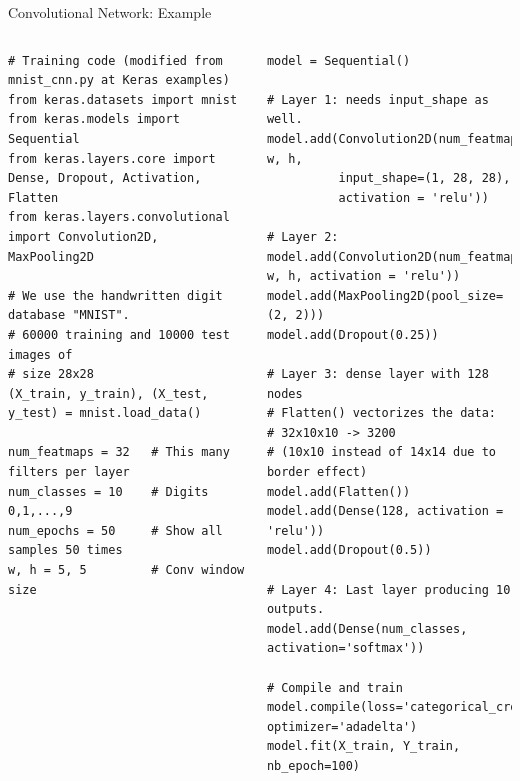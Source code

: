 \documentclass[10pt, aspectratio=169]{beamer} %
\begin{document}
\begin{frame}[fragile]{Convolutional Network: Example}
\begin{columns}
\begin{lstlisting}
# Training code (modified from mnist_cnn.py at Keras examples)
from keras.datasets import mnist
from keras.models import Sequential
from keras.layers.core import Dense, Dropout, Activation, Flatten
from keras.layers.convolutional import Convolution2D, MaxPooling2D

# We use the handwritten digit database "MNIST".
# 60000 training and 10000 test images of 
# size 28x28
(X_train, y_train), (X_test, y_test) = mnist.load_data()

num_featmaps = 32   # This many filters per layer
num_classes = 10    # Digits 0,1,...,9
num_epochs = 50     # Show all samples 50 times
w, h = 5, 5         # Conv window size
\end{lstlisting}

\begin{lstlisting}
model = Sequential()

# Layer 1: needs input_shape as well.
model.add(Convolution2D(num_featmaps, w, h,
          input_shape=(1, 28, 28), 
          activation = 'relu'))

# Layer 2:
model.add(Convolution2D(num_featmaps, w, h, activation = 'relu'))
model.add(MaxPooling2D(pool_size=(2, 2)))
model.add(Dropout(0.25))

# Layer 3: dense layer with 128 nodes
# Flatten() vectorizes the data:
# 32x10x10 -> 3200 
# (10x10 instead of 14x14 due to border effect)
model.add(Flatten()) 
model.add(Dense(128, activation = 'relu'))
model.add(Dropout(0.5))

# Layer 4: Last layer producing 10 outputs.
model.add(Dense(num_classes, activation='softmax'))

# Compile and train
model.compile(loss='categorical_crossentropy', optimizer='adadelta')
model.fit(X_train, Y_train, nb_epoch=100)
\end{lstlisting}
\end{columns}
\end{frame}
\end{document}
